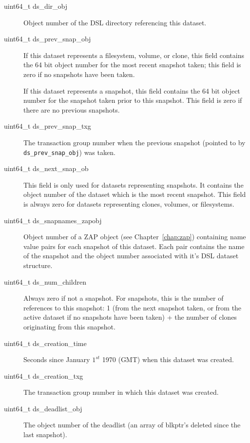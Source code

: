 \begin{description}
\item[uint64\_t ds\_dir\_obj]
  Object number of the DSL directory referencing this dataset.

\item[uint64\_t ds\_prev\_snap\_obj]
  If this dataset represents a filesystem, volume, or clone,
  this field contains the 64 bit object number for the most recent snapshot taken;
  this field is zero if no snapshots have been taken.

  If this dataset represents a snapshot,
  this field contains the 64 bit object number for the snapshot taken prior to this snapshot.
  This field is zero if there are no previous snapshots.

\item[uint64\_t ds\_prev\_snap\_txg]
  The transaction group number when the previous snapshot
  (pointed to by \lstinline{ds_prev_snap_obj}) was taken.

\item[uint64\_t ds\_next\_snap\_ob]
  This field is only used for datasets representing snapshots.
  It contains the object number of the dataset
  which is the most recent snapshot.
  This field is always zero for datasets representing clones, volumes, or filesystems.

\item[uint64\_t ds\_snapnames\_zapobj]
  Object number of a ZAP object (see Chapter~\ref{chap:zap})
  containing name value pairs for each snapshot of this dataset.
  Each pair contains the name of the snapshot
  and the object number associated with it's DSL dataset structure.

\item[uint64\_t ds\_num\_children]
  Always zero if not a snapshot.
  For snapshots, this is the number of references to this snapshot: 1
  (from the next snapshot taken, or from the active dataset if no snapshots have been taken)
  + the number of clones originating from this snapshot.

\item[uint64\_t ds\_creation\_time]
  Seconds since January $1^{st}$ 1970 (GMT) when this dataset was created.

\item[uint64\_t ds\_creation\_txg]
  The transaction group number in which this dataset  was created.

\item[uint64\_t ds\_deadlist\_obj]
  The object number of the deadlist (an array of blkptr's deleted since the last snapshot).


\end{description}
